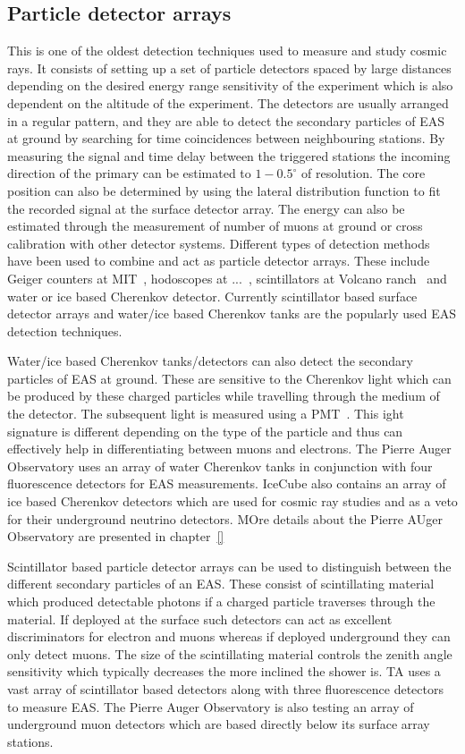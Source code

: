 \subsection*{Particle detector arrays}
\label{sec:EAS_cher}
This is one of the oldest detection techniques used to measure and study cosmic rays. It consists of setting up a set of particle detectors spaced by large distances depending on the desired energy range sensitivity of the experiment which is also dependent on the altitude of the experiment. The detectors are usually arranged in a regular pattern, and they are able to detect the secondary particles of EAS at ground by searching for time coincidences between neighbouring stations. By measuring the signal and time delay between the triggered stations the incoming direction of the primary can be estimated to $1-0.5^{\circ}$ of resolution. The core position can also be determined by using the lateral distribution function to fit the recorded signal at the surface detector array. The energy can also be estimated through the measurement of number of muons at ground or cross calibration with other detector systems. Different types of detection methods have been used to combine and act as particle detector arrays. These include Geiger counters at MIT~\cite{}, hodoscopes at ...~\cite{}, scintillators at Volcano ranch~\cite{} and water or ice based Cherenkov detector. Currently scintillator based surface detector arrays and water/ice based Cherenkov tanks are the popularly used EAS detection techniques. 

Water/ice based Cherenkov tanks/detectors can also detect the secondary particles of EAS at ground. These are sensitive to the Cherenkov light which can be produced by these charged particles while travelling through the medium of the detector. The subsequent light is measured using a PMT~\cite{}. This ight signature is different depending on the type of the particle and thus can effectively help in differentiating between muons and electrons. The Pierre Auger Observatory uses an array of water Cherenkov tanks in conjunction with four fluorescence detectors for EAS measurements. IceCube also contains an array of ice based Cherenkov detectors which are used for cosmic ray studies and as a veto for their underground neutrino detectors. MOre details about the Pierre AUger Observatory are presented in chapter~\ref{}

Scintillator based particle detector arrays can be used to distinguish between the different secondary particles of an EAS. These consist of scintillating material which produced detectable photons if a charged particle traverses through the material. If deployed at the surface such detectors can act as excellent discriminators for electron and muons whereas if deployed underground they can only detect muons. The size of the scintillating material controls the zenith angle sensitivity which typically decreases the more inclined the shower is. TA uses a vast array of scintillator based detectors along with three fluorescence detectors to measure EAS. The Pierre Auger Observatory is also testing an array of underground muon detectors which are based directly below its surface array stations.


